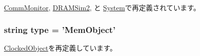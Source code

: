 \hyperlink{classCommMonitor_1_1CommMonitor_a17da7064bc5c518791f0c891eff05fda}{CommMonitor}, \hyperlink{classDRAMSim2_1_1DRAMSim2_a17da7064bc5c518791f0c891eff05fda}{DRAMSim2}, と \hyperlink{classSystem_1_1System_a17da7064bc5c518791f0c891eff05fda}{System}で再定義されています。\hypertarget{classMemObject_1_1MemObject_acce15679d830831b0bbe8ebc2a60b2ca}{
\subsubsection[{type}]{\setlength{\rightskip}{0pt plus 5cm}string {\bf type} = '{\bf MemObject}'}}
\label{classMemObject_1_1MemObject_acce15679d830831b0bbe8ebc2a60b2ca}


\hyperlink{classClockedObject_1_1ClockedObject_acce15679d830831b0bbe8ebc2a60b2ca}{ClockedObject}を再定義しています。

